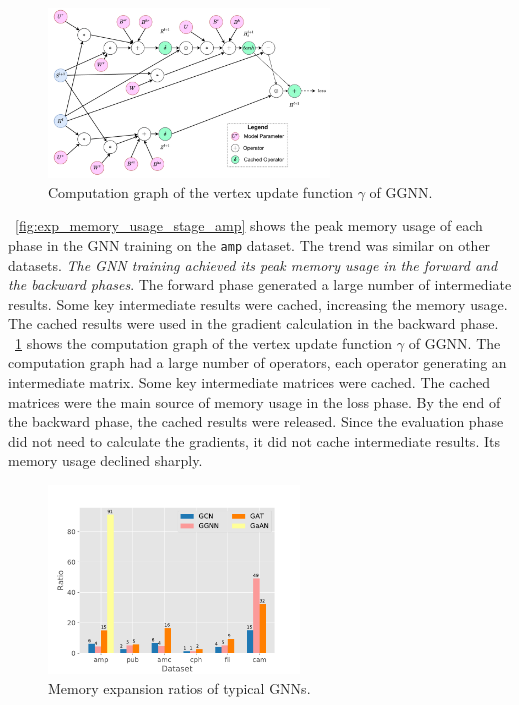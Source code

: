 \begin{figure}
    \centering
    \includegraphics[height=4.5cm]{figs/illustration/ggnn_vertex_func_computation_graph.pdf}
    \caption{Computation graph of the vertex update function $\gamma$ of GGNN.}
    \label{fig:ggnn_vertex_func_computation_graph}
\end{figure}

\figurename~\ref{fig:exp_memory_usage_stage_amp} shows the peak memory usage of each phase in the GNN training on the \texttt{amp} dataset.
The trend was similar on other datasets.
\emph{The GNN training achieved its peak memory usage in the forward and the backward phases}.
The forward phase generated a large number of intermediate results.
Some key intermediate results were cached, increasing the memory usage.
The cached results were used in the gradient calculation in the backward phase.
\figurename~\ref{fig:ggnn_vertex_func_computation_graph} shows the computation graph of the vertex update function $\gamma$ of GGNN.
The computation graph had a large number of operators, each operator generating an intermediate matrix.
Some key intermediate matrices were cached.
The cached matrices were the main source of memory usage in the loss phase.
By the end of the backward phase, the cached results were released.
Since the evaluation phase did not need to calculate the gradients, it did not cache intermediate results.
Its memory usage declined sharply.

\begin{figure}
    \centering
    \includegraphics[height=5cm]{figs/experiments/exp_memory_expansion_ratio.pdf}
    \caption{Memory expansion ratios of typical GNNs.}
    \label{fig:exp_memory_expansion_ratio}
\end{figure}

